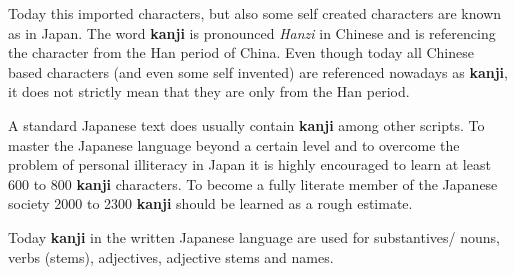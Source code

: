Today this imported characters, but also some self created characters are known
as  in Japan. The word \textbf{kanji} is
pronounced \textit{Hanzi} in Chinese and is referencing the character
 from the Han  period of China. Even
though today all Chinese based characters (and even some self invented) are
referenced nowadays as \textbf{kanji}, it does not strictly mean that they are
only from the Han period.

A standard Japanese text does usually contain \textbf{kanji} among other
scripts. To master the Japanese language beyond a certain level and to
overcome the problem of personal illiteracy in Japan it is highly encouraged to
learn at least 600 to 800 \textbf{kanji} characters. To become a fully literate
member of the Japanese society 2000 to 2300 \textbf{kanji} should be learned as
a rough estimate.

Today \textbf{kanji} in the written Japanese language are used for
substantives/ nouns, verbs (stems), adjectives, adjective stems and names.

